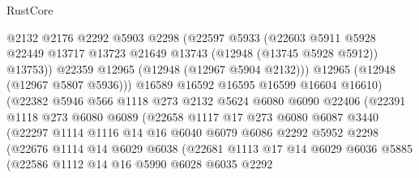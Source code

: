 \begin{lexlean}{RustCore}
\begin{coremodule}
                        @2132
                        @2176
                        @2292
                        @5903
                        @2298
                        (@22597
                          @5933
                          (@22603
                            @5911
                            @5928
                            @22449
                            @13717
                            @13723
                            @21649
                            @13743
                            (@12948 (@13745 @5928 @5912))
                            @13753))
                        @22359
                        @12965
                        (@12948 (@12967 @5904 @2132)))
                      @12965
                      (@12948 (@12967 @5807 @5936)))
                    @16589
                    @16592
                    @16595
                    @16599
                    @16604
                    @16610)
                  (@22382
                    @5946
                    @566
                    @1118
                    @273
                    @2132
                    @5624
                    @6080
                    @6090
                    @22406
                    (@22391
                      @1118
                      @273
                      @6080
                      @6089
                      (@22658
                        @1117
                        @17
                        @273
                        @6080
                        @6087
                        @3440
                        (@22297
                          @1114
                          @1116
                          @14
                          @16
                          @6040
                          @6079
                          @6086
                          @2292
                          @5952
                          @2298
                          (@22676
                            @1114
                            @14
                            @6029
                            @6038
                            (@22681
                              @1113
                              @17
                              @14
                              @6029
                              @6036
                              @5885
                              (@22586
                                @1112
                                @14
                                @16
                                @5990
                                @6028
                                @6035
                                @2292

\end{coremodule}
\end{lexlean}
